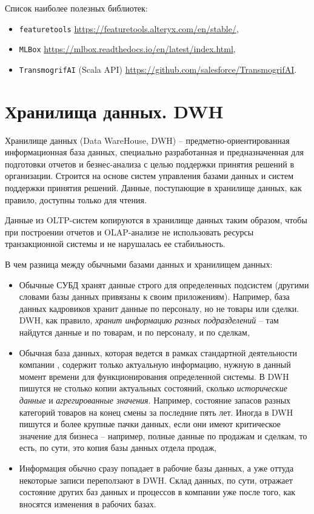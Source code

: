 \documentclass[%
	11pt,
	a4paper,
	utf8,
		]{article}
\begin{document}
Список наиболее полезных библиотек:
\begin{itemize}
	\item \texttt{featuretools} \url{https://featuretools.alteryx.com/en/stable/},
	
	\item \texttt{MLBox} \url{https://mlbox.readthedocs.io/en/latest/index.html},
	
	\item \texttt{TransmogrifAI} (Scala API) \url{https://github.com/salesforce/TransmogrifAI}.
\end{itemize}



\section{Хранилища данных. DWH}

Хранилище данных (Data WareHouse, DWH) -- предметно-ориентированная информационная база данных, специально разработанная и предназначенная для подготовки отчетов и безнес-анализа с целью поддержки принятия решений в организации. Строится на основе систем управления базами данных и систем поддержки принятия решений. Данные, поступающие в хранилище данных, как правило, доступны только для чтения.


Данные из OLTP-систем копируются в хранилище данных таким образом, чтобы при построении отчетов и OLAP-анализе не использовать ресурсы транзакционной системы и не нарушалась ее стабильность.

В чем разница между обычными базами данных и хранилищем данных:
\begin{itemize}
	\item Обычные СУБД хранят данные строго для определенных подсистем (другими словами базы данных привязаны к своим приложениям). Например, база данных кадровиков хранит данные по персоналу, но не товары или сделки. DWH, как правило, \emph{хранит информацию разных подразделений} -- там найдутся данные и по товарам, и по персоналу, и по сделкам,
	
	\item Обычная база данных, которая ведется в рамках стандартной деятельности компании , содержит только актуальную информацию, нужную в данный момент времени для функционирования определенной системы. В DWH пишутся не столько копии актуальных состояний, сколько \emph{исторические данные} и \emph{агрегированные значения}. Например, состояние запасов разных категорий товаров на конец смены за последние пять лет. Иногда в DWH пишутся и более крупные пачки данных, если они имеют критическое значение для бизнеса -- например, полные данные по продажам и сделкам, то есть, по сути, это копия базы данных отдела продаж,
	
	\item Информация обычно сразу попадает в рабочие базы данных, а уже оттуда некоторые записи переползают в DWH. Склад данных, по сути, отражает состояние других баз данных и процессов в компании уже после того, как вносятся изменения в рабочих базах.
\end{itemize}
\end{document}

